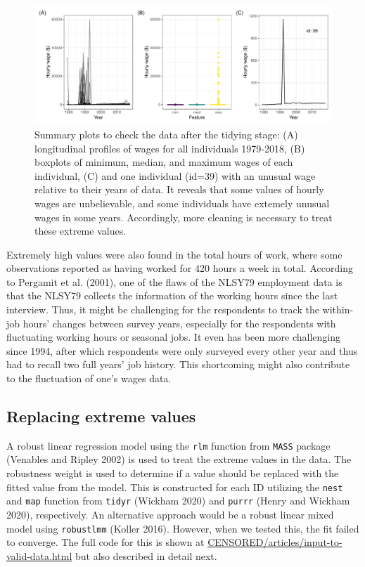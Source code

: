 \documentclass[12pt]{article}
\begin{document}
\begin{figure}

{\centering \includegraphics[width=1\linewidth]{figures/feature-plot-1}

}

\caption{Summary plots to check the data after the tidying stage: (A) longitudinal profiles of wages for all individuals 1979-2018, (B) boxplots of minimum, median, and maximum wages of each individual, (C) and one individual (id=39) with an unusual wage relative to their years of data. It reveals that some values of hourly wages are unbelievable, and some individuals have extemely unusual wages in some years. Accordingly, more cleaning is necessary to treat these extreme values.}\label{fig:feature-plot}
\end{figure}

Extremely high values were also found in the total hours of work, where some observations reported as having worked for 420 hours a week in total. According to Pergamit et al. (2001), one of the flaws of the NLSY79 employment data is that the NLSY79 collects the information of the working hours since the last interview. Thus, it might be challenging for the respondents to track the within-job hours' changes between survey years, especially for the respondents with fluctuating working hours or seasonal jobs. It even has been more challenging since 1994, after which respondents were only surveyed every other year and thus had to recall two full years' job history. This shortcoming might also contribute to the fluctuation of one's wages data.

\hypertarget{censor}{%
\subsection{Replacing extreme values}\label{censor}}

A robust linear regression model using the \texttt{rlm} function from \texttt{MASS} package (Venables and Ripley 2002) is used to treat the extreme values in the data. The robustness weight is used to determine if a value should be replaced with the fitted value from the model. This is constructed for each ID utilizing the \texttt{nest} and \texttt{map} function from \texttt{tidyr} (Wickham 2020) and \texttt{purrr} (Henry and Wickham 2020), respectively. An alternative approach would be a robust linear mixed model using \texttt{robustlmm} (Koller 2016). However, when we tested this, the fit failed to converge. The full code for this is shown at \url{CENSORED/articles/input-to-valid-data.html} but also described in detail next.
\end{document}
